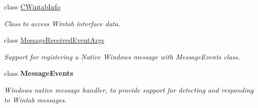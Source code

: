 \begin{DoxyCompactItemize}
class \hyperlink{class_wintab_d_n_1_1_c_wintab_info}{CWintabInfo}
\begin{DoxyCompactList}\small\item\em Class to access Wintab interface data. \item\end{DoxyCompactList}\item 
class \hyperlink{class_wintab_d_n_1_1_message_received_event_args}{MessageReceivedEventArgs}
\begin{DoxyCompactList}\small\item\em Support for registering a Native Windows message with MessageEvents class. \item\end{DoxyCompactList}\item 
class {\bfseries MessageEvents}
\begin{DoxyCompactList}\small\item\em Windows native message handler, to provide support for detecting and responding to Wintab messages. \item\end{DoxyCompactList}\end{DoxyCompactItemize}
